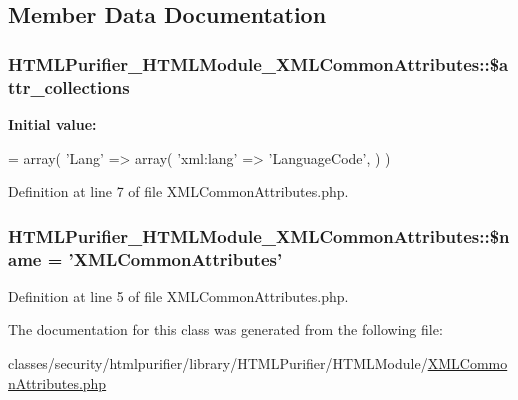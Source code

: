 \subsection{Member Data Documentation}
\hypertarget{classHTMLPurifier__HTMLModule__XMLCommonAttributes_a30b37c8810e0438162b3db739718d253}{
\subsubsection[{\$attr\+\_\+collections}]{\setlength{\rightskip}{0pt plus 5cm}H\+T\+M\+L\+Purifier\+\_\+\+H\+T\+M\+L\+Module\+\_\+\+X\+M\+L\+Common\+Attributes\+::\$attr\+\_\+collections}}\label{classHTMLPurifier__HTMLModule__XMLCommonAttributes_a30b37c8810e0438162b3db739718d253}
{\bfseries Initial value\+:}
\begin{DoxyCode}
= array(
        \textcolor{stringliteral}{'Lang'} => array(
            \textcolor{stringliteral}{'xml:lang'} => \textcolor{stringliteral}{'LanguageCode'},
        )
    )
\end{DoxyCode}


Definition at line 7 of file X\+M\+L\+Common\+Attributes.\+php.

\hypertarget{classHTMLPurifier__HTMLModule__XMLCommonAttributes_aa54863fead1c28bd1c48905f8860bdc4}{
\subsubsection[{\$name}]{\setlength{\rightskip}{0pt plus 5cm}H\+T\+M\+L\+Purifier\+\_\+\+H\+T\+M\+L\+Module\+\_\+\+X\+M\+L\+Common\+Attributes\+::\$name = 'X\+M\+L\+Common\+Attributes'}}\label{classHTMLPurifier__HTMLModule__XMLCommonAttributes_aa54863fead1c28bd1c48905f8860bdc4}


Definition at line 5 of file X\+M\+L\+Common\+Attributes.\+php.



The documentation for this class was generated from the following file\+:\begin{DoxyCompactItemize}
\item 
classes/security/htmlpurifier/library/\+H\+T\+M\+L\+Purifier/\+H\+T\+M\+L\+Module/\hyperlink{XMLCommonAttributes_8php}{X\+M\+L\+Common\+Attributes.\+php}\end{DoxyCompactItemize}
